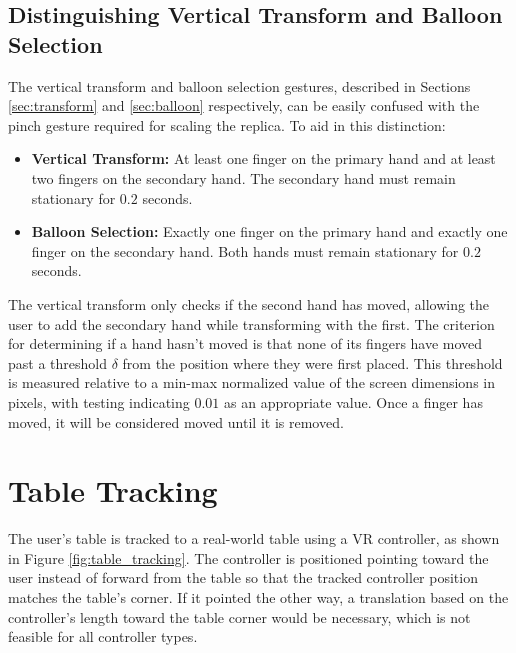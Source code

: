     \subsection{Distinguishing Vertical Transform and Balloon Selection} \label{sec:vertical_balloon}
    
        The vertical transform and balloon selection gestures, described in Sections \ref{sec:transform} and \ref{sec:balloon} respectively, can be easily confused with the pinch gesture required for scaling the replica. To aid in this distinction:
    
        \begin{itemize}
            \item \textbf{Vertical Transform:} At least one finger on the primary hand and at least two fingers on the secondary hand. The secondary hand must remain stationary for $0.2$ seconds.
            \item \textbf{Balloon Selection:} Exactly one finger on the primary hand and exactly one finger on the secondary hand. Both hands must remain stationary for $0.2$ seconds.
        \end{itemize}
    
        The vertical transform only checks if the second hand has moved, allowing the user to add the secondary hand while transforming with the first. The criterion for determining if a hand hasn't moved is that none of its fingers have moved past a threshold $\delta$ from the position where they were first placed. This threshold is measured relative to a min-max normalized value of the screen dimensions in pixels, with testing indicating $0.01$ as an appropriate value. Once a finger has moved, it will be considered moved until it is removed.

\section{Table Tracking} \label{sec:table_tracking}

    The user's table is tracked to a real-world table using a VR controller, as shown in Figure \ref{fig:table_tracking}. The controller is positioned pointing toward the user instead of forward from the table so that the tracked controller position matches the table's corner. If it pointed the other way, a translation based on the controller's length toward the table corner would be necessary, which is not feasible for all controller types.


